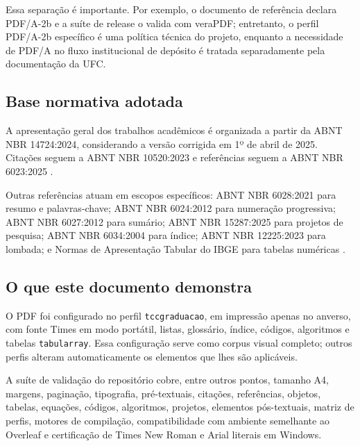 Essa separação é importante. Por exemplo, o documento de referência declara PDF/A-2b e a suíte de release o valida com veraPDF; entretanto, o perfil PDF/A-2b específico é uma política técnica do projeto, enquanto a necessidade de PDF/A no fluxo institucional de depósito é tratada separadamente pela documentação da UFC.

\subsection{Base normativa adotada}

A apresentação geral dos trabalhos acadêmicos é organizada a partir da ABNT NBR 14724:2024, considerando a versão corrigida em 1º de abril de 2025. Citações seguem a ABNT NBR 10520:2023 e referências seguem a ABNT NBR 6023:2025 \parencite{abnt14724,abnt10520,abnt6023}.

Outras referências atuam em escopos específicos: ABNT NBR 6028:2021 para resumo e palavras-chave; ABNT NBR 6024:2012 para numeração progressiva; ABNT NBR 6027:2012 para sumário; ABNT NBR 15287:2025 para projetos de pesquisa; ABNT NBR 6034:2004 para índice; ABNT NBR 12225:2023 para lombada; e Normas de Apresentação Tabular do IBGE para tabelas numéricas \parencite{abnt6028,abnt6024,abnt6027,abnt15287,abnt6034,abnt12225,ibge1993}.


\subsection{O que este documento demonstra}

O PDF foi configurado no perfil \texttt{tccgraduacao}, em impressão apenas no anverso, com fonte Times em modo portátil, listas, glossário, índice, códigos, algoritmos e tabelas \texttt{tabularray}. Essa configuração serve como corpus visual completo; outros perfis alteram automaticamente os elementos que lhes são aplicáveis.

A suíte de validação do repositório cobre, entre outros pontos, tamanho A4, margens, paginação, tipografia, pré-textuais, citações, referências, objetos, tabelas, equações, códigos, algoritmos, projetos, elementos pós-textuais, matriz de perfis, motores de compilação, compatibilidade com ambiente semelhante ao Overleaf e certificação de Times New Roman e Arial literais em Windows.


